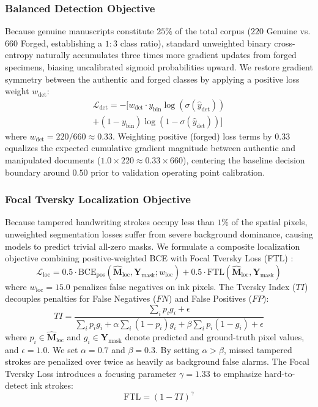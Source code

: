 \documentclass[pdflatex,sn-mathphys-num,iicol]{sn-jnl}
\begin{document}
\subsubsection{Balanced Detection Objective}
Because genuine manuscripts constitute $25\%$ of the total corpus ($220$ Genuine vs. $660$ Forged, establishing a $1:3$ class ratio), standard unweighted binary cross-entropy naturally accumulates three times more gradient updates from forged specimens, biasing uncalibrated sigmoid probabilities upward. We restore gradient symmetry between the authentic and forged classes by applying a positive loss weight $w_{\text{det}}$:
\begin{align}
\mathcal{L}_{\text{det}} = - \Big[ w_{\text{det}} \cdot y_{\text{bin}} \log(\sigma(\hat{y}_{\text{det}})) \nonumber \\
+ (1 - y_{\text{bin}}) \log(1 - \sigma(\hat{y}_{\text{det}})) \Big]\label{eq_loss_det}
\end{align}
where $w_{\text{det}} = 220 / 660 \approx 0.33$. Weighting positive (forged) loss terms by $0.33$ equalizes the expected cumulative gradient magnitude between authentic and manipulated documents ($1.0 \times 220 \approx 0.33 \times 660$), centering the baseline decision boundary around $0.50$ prior to validation operating point calibration.

\subsubsection{Focal Tversky Localization Objective}
Because tampered handwriting strokes occupy less than $1\%$ of the spatial pixels, unweighted segmentation losses suffer from severe background dominance, causing models to predict trivial all-zero masks. We formulate a composite localization objective combining positive-weighted BCE with Focal Tversky Loss (FTL) \cite{bib16,bib17}:
\begin{equation}
\mathcal{L}_{\text{loc}} = 0.5 \cdot \text{BCE}_{\text{pos}}(\hat{\mathbf{M}}_{\text{loc}}, \mathbf{Y}_{\text{mask}}; w_{\text{loc}}) + 0.5 \cdot \text{FTL}(\hat{\mathbf{M}}_{\text{loc}}, \mathbf{Y}_{\text{mask}})\label{eq_loss_loc}
\end{equation}
where $w_{\text{loc}} = 15.0$ penalizes false negatives on ink pixels. The Tversky Index ($TI$) decouples penalties for False Negatives ($FN$) and False Positives ($FP$):
\begin{equation}
TI = \frac{\sum_i p_i g_i + \epsilon}{\sum_i p_i g_i + \alpha \sum_i (1 - p_i) g_i + \beta \sum_i p_i (1 - g_i) + \epsilon}\label{eq_tversky}
\end{equation}
where $p_i \in \hat{\mathbf{M}}_{\text{loc}}$ and $g_i \in \mathbf{Y}_{\text{mask}}$ denote predicted and ground-truth pixel values, and $\epsilon = 1.0$. We set $\alpha = 0.7$ and $\beta = 0.3$. By setting $\alpha > \beta$, missed tampered strokes are penalized over twice as heavily as background false alarms. The Focal Tversky Loss introduces a focusing parameter $\gamma = 1.33$ to emphasize hard-to-detect ink strokes:
\begin{equation}
\text{FTL} = (1 - TI)^\gamma\label{eq_ftl}
\end{equation}
\end{document}
